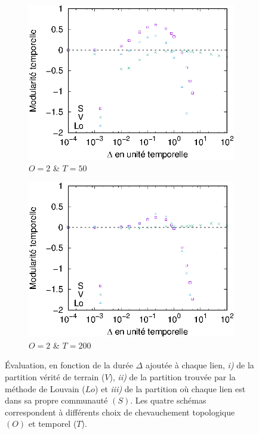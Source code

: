 \begin{figure}[h]
	\vspace*{0.7cm}
	\begin{subfigure}{0.495\textwidth}
		\includegraphics[width=\textwidth]{img/Qualite/Fonc/comp_50_T_50_O_2_Q_1.eps}
		\caption{$O=2$ \& $T=50$}
		\label{fig:versqualite_fonc_test3}
	\end{subfigure}
	\begin{subfigure}{0.495\textwidth}
		\includegraphics[width=\textwidth]{img/Qualite/Fonc/comp_100_T_200_O_2_Q_1.eps}
		\caption{$O=2$ \& $T=200$}
		\label{fig:versqualite_fonc_test4}
	\end{subfigure}	
	\caption{Évaluation, en fonction de la durée $\Delta$ ajoutée à chaque lien, \emph{i)} de la partition vérité de terrain ($V$), \emph{ii)} de la partition trouvée par la méthode de Louvain ($Lo$) et \emph{iii)} de la partition où chaque lien est dans sa propre communauté $(S)$.
	Les quatre schémas correspondent à différents choix de chevauchement topologique $(O)$ et temporel ($T$).}
	\label{fig:versqualite_fonc_test}
\end{figure}
\bigskip

